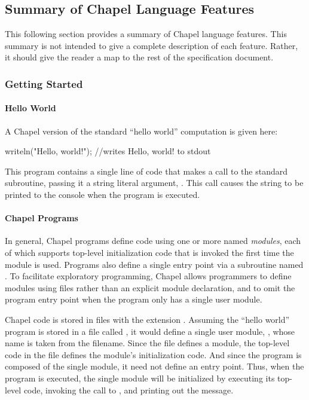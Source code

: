 \subsection{Summary of Chapel Language Features}

This following section provides a summary of Chapel language features.  
This summary is not intended to give a complete description of each feature.
Rather, it should give the reader a map to the rest of the specification
document.  

\subsubsection{Getting Started}
\paragraph{Hello World} 
A Chapel version of the standard ``hello world'' computation is given
here:
\begin{chapel}
writeln("Hello, world!"); //writes Hello, world! to stdout
\end{chapel}
\noindent This program contains a single line of code that makes a
call to the standard  subroutine, passing it a string
literal argument, .  This call causes the string
to be printed to the console when the program is executed.

\paragraph{Chapel Programs}
In general, Chapel programs define code using one or more named
\emph{modules}, each of which supports top-level initialization code
that is invoked the first time the module is used.  Programs also
define a single entry point via a subroutine named .  To
facilitate exploratory programming, Chapel allows programmers to
define modules using files rather than an explicit module declaration,
and to omit the program entry point when the program only has a single
user module.  

Chapel code is stored in files with the extension .
Assuming the ``hello world'' program is stored in a file called 
, it
would define a single user module, , whose name is taken
from the filename.  Since the file defines a module, the top-level
code in the file defines the module's initialization code.  And since
the program is composed of the single  module, it need not
define an entry point.  Thus, when the program is executed, the single
 module will be initialized by executing its top-level
code, invoking the call to , and printing out the
message.

